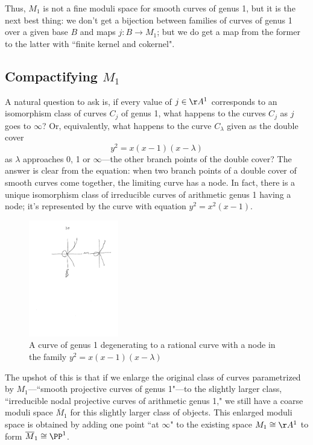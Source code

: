 Thus, $M_1$ is not a fine moduli space for smooth curves of genus 1, but it is the next best thing: we don't get a bijection between families of curves of genus 1 over a given base $B$ and maps $j : B \to M_1$; but we do get a map from the former to the latter with ``finite kernel and cokernel".

\subsection{Compactifying $M_1$}

A natural question to ask is, if every value of $j \in \AA^1$ corresponds to an isomorphism class of curves $C_j$ of genus 1, what happens to the curves $C_j$ as $j$ goes to $\infty$? Or, equivalently, what happens to the curve $C_\lambda$ given as the double cover
$$
y^2 = x(x-1)(x - \lambda)
$$
as $\lambda$ approaches 0, 1 or $\infty$---the other branch points of the double cover? The answer is clear from the equation: when two branch points of a double cover of smooth curves come together, the limiting curve has a node. In fact, there is a unique isomorphism class of irreducible curves of arithmetic genus 1 having a node; it's represented by the curve with equation $y^2=x^2(x-1)$.

\begin{figure}\label{Fig7.0}
\begin{center}
\centerline {\includegraphics[height=2in]{"Fig7.0.pdf"}}
\caption{A curve of genus 1 degenerating to a rational curve with a node
in the family $y^2 = x(x-1)(x - \lambda)$}
\label{default}
\end{center}
\end{figure}

The upshot of this is that if we enlarge the original class of curves parametrized by $M_1$---``smooth projective curves of genus 1"---to the slightly larger class, ``irreducible nodal projective curves of arithmetic genus 1," we still have a coarse moduli space $\overline M_1$ for this slightly larger class of objects. This enlarged moduli space is obtained by adding one point ``at $\infty$" to the existing space $M_1 \cong \AA^1$ to form $\overline M_1 \cong \PP^1$.

